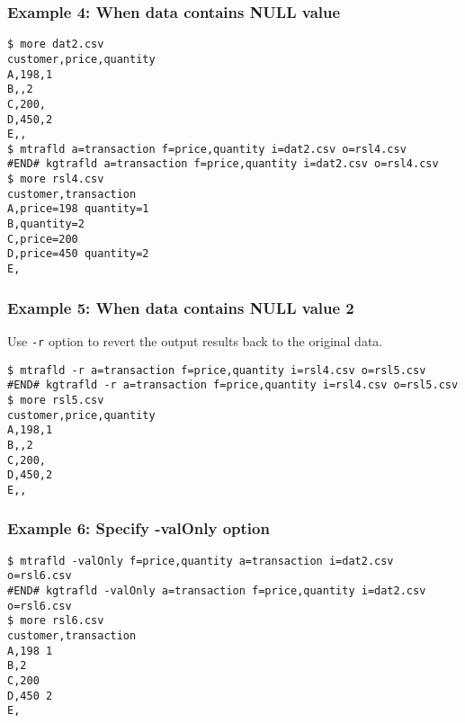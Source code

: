 \subsubsection*{Example 4: When data contains NULL value}



\begin{Verbatim}[baselinestretch=0.7,frame=single]
$ more dat2.csv
customer,price,quantity
A,198,1
B,,2
C,200,
D,450,2
E,,
$ mtrafld a=transaction f=price,quantity i=dat2.csv o=rsl4.csv
#END# kgtrafld a=transaction f=price,quantity i=dat2.csv o=rsl4.csv
$ more rsl4.csv
customer,transaction
A,price=198 quantity=1
B,quantity=2
C,price=200
D,price=450 quantity=2
E,
\end{Verbatim}
\subsubsection*{Example 5: When data contains NULL value 2}

Use \verb|-r| option to revert the output results back to the original data.


\begin{Verbatim}[baselinestretch=0.7,frame=single]
$ mtrafld -r a=transaction f=price,quantity i=rsl4.csv o=rsl5.csv
#END# kgtrafld -r a=transaction f=price,quantity i=rsl4.csv o=rsl5.csv
$ more rsl5.csv
customer,price,quantity
A,198,1
B,,2
C,200,
D,450,2
E,,
\end{Verbatim}
\subsubsection*{Example 6: Specify -valOnly option}



\begin{Verbatim}[baselinestretch=0.7,frame=single]
$ mtrafld -valOnly f=price,quantity a=transaction i=dat2.csv o=rsl6.csv
#END# kgtrafld -valOnly a=transaction f=price,quantity i=dat2.csv o=rsl6.csv
$ more rsl6.csv
customer,transaction
A,198 1
B,2
C,200
D,450 2
E,
\end{Verbatim}
